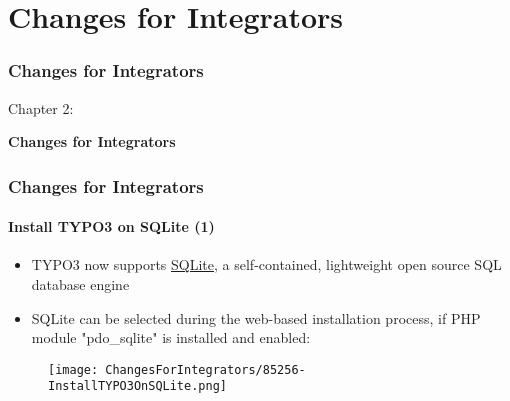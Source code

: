 %

\section{Changes for Integrators}
\begin{frame}[fragile]
	\frametitle{Changes for Integrators}

	\begin{center}\huge{Chapter 2:}\end{center}
	\begin{center}\huge{\color{typo3darkgrey}\textbf{Changes for Integrators}}\end{center}

\end{frame}


\begin{frame}[fragile]
	\frametitle{Changes for Integrators}
	\framesubtitle{Install TYPO3 on SQLite (1)}

	\begin{itemize}
		\item TYPO3 now supports \href{https://www.sqlite.org}{SQLite},
			a self-contained, lightweight open source SQL database engine
		\item SQLite can be selected during the web-based installation process,
			if PHP module "pdo\_sqlite" is installed and enabled:
	\end{itemize}

	\begin{figure}
		\texttt{[image: ChangesForIntegrators/85256-InstallTYPO3OnSQLite.png]}
	\end{figure}

\end{frame}


